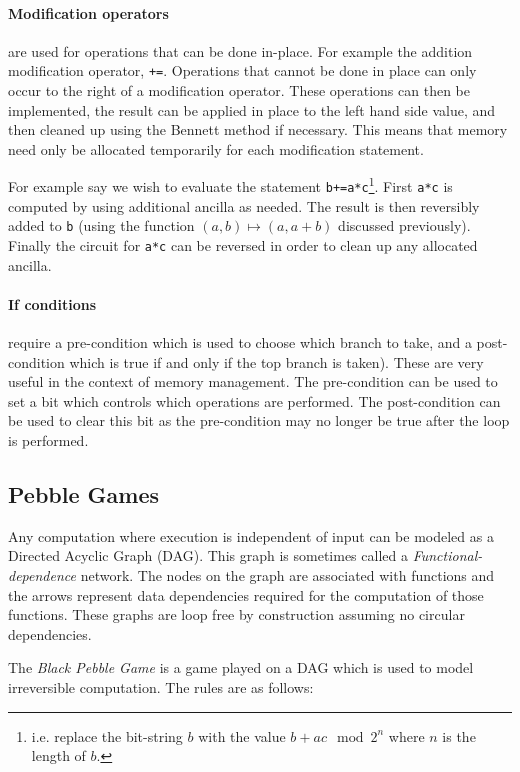 \paragraph{Modification operators} are used for operations that can be done
in-place. For example the addition modification operator, \verb|+=|. Operations
that cannot be done in place can only occur to the right of a modification
operator. These operations can then be implemented, the result can be applied in
place to the left hand side value, and then cleaned up using the Bennett method if
necessary. This means that memory need only be allocated temporarily for each
modification statement.

For example say we wish to evaluate the statement \verb|b+=a*c|\footnote{i.e.
replace the bit-string $b$ with the value $b+ac\mod 2^n$ where $n$ is the
length of $b$.}. First \verb|a*c| is computed by using additional ancilla as
needed. The result is then reversibly added to \verb|b| (using the function
$(a,b)\mapsto(a,a+b)$ discussed previously). Finally the circuit for \verb|a*c|
can be reversed in order to clean up any allocated ancilla.

\paragraph{If conditions} require a pre-condition which is used to choose which
branch to take, and a post-condition which is true if and only if the top
branch is taken). These are very useful in the
context of memory management. The pre-condition can be used to set a bit which
controls which operations are performed. The post-condition can be used to
clear this bit as the pre-condition may no longer be true after the loop is
performed.


\subsection{Pebble Games}

Any computation where execution is independent of input can be modeled as a
Directed Acyclic Graph (DAG). This graph is sometimes called a
\emph{Functional-dependence} network.  The nodes on the graph are associated
with functions and the arrows represent data dependencies required for the
computation of those functions. These graphs are loop free by construction
assuming  no circular dependencies.

The \emph{Black Pebble Game} is a game played on a DAG which is used to model
irreversible computation. The rules are as follows:

